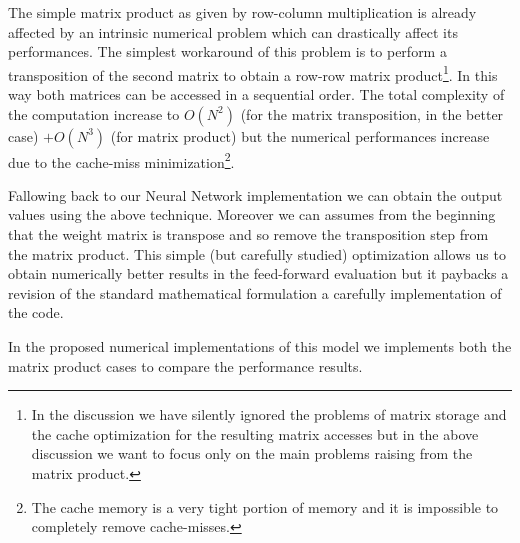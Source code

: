 \documentclass{standalone}
\begin{document}
The simple matrix product as given by row-column multiplication is already affected by an intrinsic numerical problem which can drastically affect its performances.
The simplest workaround of this problem is to perform a transposition of the second matrix to obtain a row-row matrix product\footnote{
  In the discussion we have silently ignored the problems of matrix storage and the cache optimization for the resulting matrix accesses but in the above discussion we want to focus only on the main problems raising from the matrix product.
}.
In this way both matrices can be accessed in a sequential order.
The total complexity of the computation increase to $O(N^2)$ (for the matrix transposition, in the better case) $+ O(N^3)$ (for matrix product) but the numerical performances increase due to the cache-miss minimization\footnote{
  The cache memory is a very tight portion of memory and it is impossible to completely remove cache-misses.
}.

Fallowing back to our Neural Network implementation we can obtain the output values using the above technique.
Moreover we can assumes from the beginning that the weight matrix is transpose and so remove the transposition step from the matrix product.
This simple (but carefully studied) optimization allows us to obtain numerically better results in the feed-forward evaluation but it paybacks a revision of the standard mathematical formulation a carefully implementation of the code.

In the proposed numerical implementations of this model we implements both the matrix product cases to compare the performance results.

\end{document}
